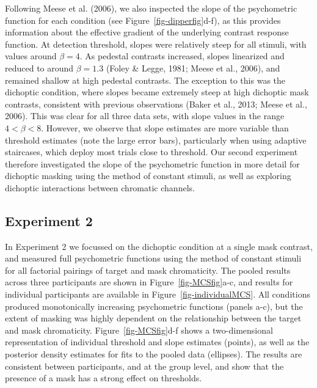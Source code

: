 \documentclass[
  letterpaper,
  DIV=11,
  numbers=noendperiod]{scrartcl}
\begin{document}
Following Meese et al. (2006), we also inspected the slope of the
psychometric function for each condition (see
Figure~\ref{fig-dipperfig}d-f), as this provides information about the
effective gradient of the underlying contrast response function. At
detection threshold, slopes were relatively steep for all stimuli, with
values around \(\beta=4\). As pedestal contrasts increased, slopes
linearized and reduced to around \(\beta=1.3\) (Foley \& Legge, 1981;
Meese et al., 2006), and remained shallow at high pedestal contrasts.
The exception to this was the dichoptic condition, where slopes became
extremely steep at high dichoptic mask contrasts, consistent with
previous observations (Baker et al., 2013; Meese et al., 2006). This was
clear for all three data sets, with slope values in the range
\(4 < \beta < 8\). However, we observe that slope estimates are more
variable than threshold estimates (note the large error bars),
particularly when using adaptive staircases, which deploy most trials
close to threshold. Our second experiment therefore investigated the
slope of the psychometric function in more detail for dichoptic masking
using the method of constant stimuli, as well as exploring dichoptic
interactions between chromatic channels.

\hypertarget{experiment-2}{%
\subsection{Experiment 2}\label{experiment-2}}

In Experiment 2 we focussed on the dichoptic condition at a single mask
contrast, and measured full psychometric functions using the method of
constant stimuli for all factorial pairings of target and mask
chromaticity. The pooled results across three participants are shown in
Figure~\ref{fig-MCSfig}a-c, and results for individual participants are
available in Figure~\ref{fig-individualMCS}. All conditions produced
monotonically increasing psychometric functions (panels a-c), but the
extent of masking was highly dependent on the relationship between the
target and mask chromaticity. Figure~\ref{fig-MCSfig}d-f shows a
two-dimensional representation of individual threshold and slope
estimates (points), as well as the posterior density estimates for fits
to the pooled data (ellipses). The results are consistent between
participants, and at the group level, and show that the presence of a
mask has a strong effect on thresholds.
\end{document}
